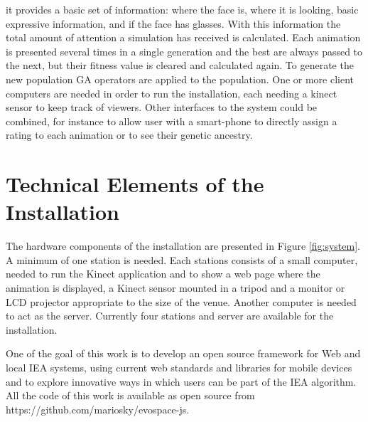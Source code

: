 \documentclass[letterpaper]{article}
\begin{document}
it provides a basic set of information: where the face is, where it is looking, 
basic expressive information, and if the face has glasses. With this information 
the total amount of attention a simulation has received is calculated. Each animation is 
presented several times in a single generation and the best are always passed to the next, but
their fitness value is cleared and calculated again. To generate the new population GA operators
are applied to the population. One or more client computers are needed in order to run the 
installation, each needing a kinect sensor to keep track of viewers. Other interfaces to
the system could be combined, for instance to allow user with a smart-phone to directly assign
a rating to each animation or to see their genetic ancestry.

\section{Technical Elements of the Installation}
The hardware components of the installation are presented in Figure \ref{fig:system}. A
minimum of one station is needed. Each stations consists of a small computer, needed 
to run the Kinect application and to show a web page where the animation is displayed, 
a Kinect sensor mounted in a tripod and a monitor or LCD projector appropriate to the
size of the venue. Another computer is needed to act as the server. Currently four stations
and server are available for the installation.  

One of the  goal of this work is to develop an open source framework for Web and local
IEA systems, using current web standards and libraries for mobile devices and to explore 
innovative ways in which users can be part of the IEA algorithm. All the code of this work
is available as open source from https://github.com/mariosky/evospace-js. 















\end{document}
